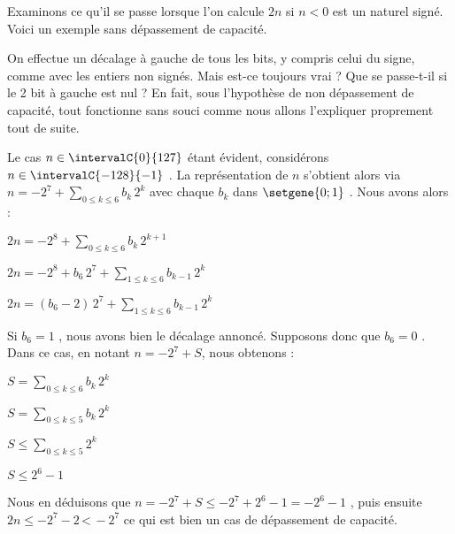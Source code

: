 Examinons ce qu'il se passe lorsque l'on calcule  $2 n$ si $n < 0$ est un naturel signé.
Voici un exemple sans dépassement de capacité.


\medskip


\medskip


\medskip


On effectue un décalage à gauche de tous les bits, y compris celui du signe, comme avec les entiers non signés.
Mais est-ce toujours vrai ? Que se passe-t-il si le 2\ieme{} bit à gauche est nul ?
En fait, sous l'hypothèse de non dépassement de capacité, tout fonctionne sans souci comme nous allons l'expliquer proprement tout de suite.

\medskip

Le cas $n \in \intervalC{0}{127}$ étant évident, considérons $n \in \intervalC{-128}{-1}$ .
La représentation de $n$ s'obtient alors via
$\displaystyle n = -2^7 + \sum_{0 \leq k \leq 6} b_k \, 2^k$ avec chaque $b_k$ dans $\setgene{0 ; 1}$ .
Nous avons alors :

\medskip

$\displaystyle 2 n 
	= -2^8 + \sum_{0 \leq k \leq 6} b_k \, 2^{k+1}$

\smallskip

$\displaystyle 2 n 
	= -2^8 + b_6 \, 2^7 + \sum_{1 \leq k \leq 6} b_{k-1} \, 2^k$

\smallskip

$\displaystyle 2 n 
	= (b_6 - 2) \, 2^7 + \sum_{1 \leq k \leq 6} b_{k-1} \, 2^k$

\medskip

Si $b_6 = 1$ , nous avons bien le décalage annoncé. Supposons donc que $b_6 = 0$ . Dans ce cas, en notant $n = -2^7 + S$, nous obtenons :

\medskip

$\displaystyle S = \sum_{0 \leq k \leq 6} b_k \, 2^k$

\smallskip

$\displaystyle S = \sum_{0 \leq k \leq 5} b_k \, 2^k$

\smallskip

$\displaystyle S \leq \sum_{0 \leq k \leq 5} 2^k$

\smallskip

$\displaystyle S \leq 2^6 - 1$

\medskip

Nous en déduisons que $n = -2^7 + S \leq -2^7 + 2^6 - 1 = -2^6 - 1$ , puis ensuite $2n \leq -2^7 - 2 \, \text{<} \, -2^7$ ce qui est bien un cas de dépassement de capacité.
